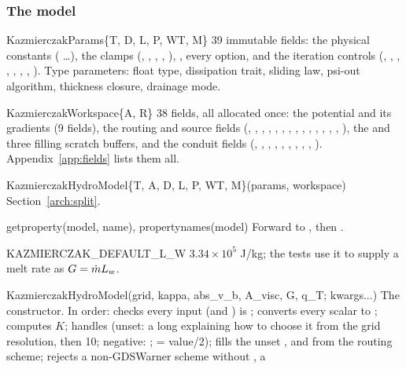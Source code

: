 \subsubsection*{The model}
\begin{fnlist}
\item[KazmierczakParams\{T, D, L, P, WT, M\}] 39 immutable fields: the physical constants ( \ldots {}), the clamps
  (, , , , ), , every option, and the iteration controls
  (, , , , ,
  , , ). Type parameters: float type, dissipation trait, sliding law, psi-out algorithm,
  thickness closure, drainage mode.
\item[KazmierczakWorkspace\{A, R\}] 38 fields, all allocated once: the potential and its gradients (9 fields), the routing and source
  fields (, , , , , , , , , ,
  , , , , ), the  and three filling scratch buffers, and the
  conduit fields (, , , , , , , , ,
  ). Appendix~\ref{app:fields} lists them all.
\item[KazmierczakHydroModel\{T, A, D, L, P, WT, M\}(params, workspace)] Section~\ref{arch:split}.
\item[getproperty(model, name), propertynames(model)] Forward  to , then .
\item[KAZMIERCZAK\_DEFAULT\_L\_W] $3.34\times10^5$ J/kg; the tests use it to supply a melt rate as $G = \dot m L_w$.
\item[KazmierczakHydroModel(grid, kappa, abs\_v\_b, A\_visc, G, q\_T; kwargs...)] The constructor. In order: checks every input (and
  ) is ; converts every scalar to ; computes $K$; handles
   (unset: a long  explaining how to choose it from the grid resolution, then 10; negative:
  ;  = value/2); fills the unset ,  and
   from the routing scheme; rejects a non-GDSWarner scheme without , a

\end{fnlist}
